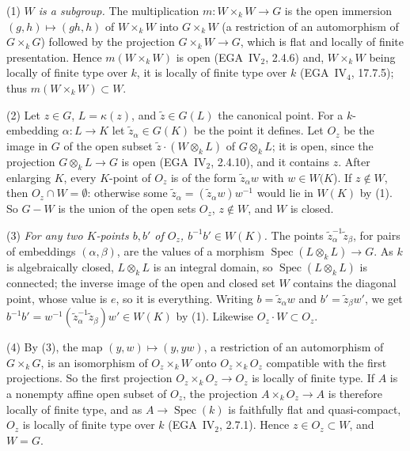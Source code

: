 (1) \emph{\(W\) is a subgroup.} The multiplication \(m\colon W\times_kW\to G\) is the open immersion
\((g,h)\mapsto(gh,h)\) of \(W\times_kW\) into \(G\times_kW\) (a restriction of an automorphism of
\(G\times_kG\)) followed by the projection \(G\times_kW\to G\), which is flat and locally of finite
presentation. Hence \(m(W\times_kW)\) is open (EGA~IV\(_2\), 2.4.6) and, \(W\times_kW\) being locally
of finite type over \(k\), it is locally of finite type over \(k\) (EGA~IV\(_4\), 17.7.5); thus
\(m(W\times_kW)\subset W\).

(2) Let \(z\in G\), \(L=\kappa(z)\), and \(\tilde z\in G(L)\) the canonical point. For a
\(k\)-embedding \(\alpha\colon L\to K\) let \(\tilde z_\alpha\in G(K)\) be the point it defines. Let
\(O_z\) be the image in \(G\) of the open subset \(\tilde z\cdot(W\otimes_kL)\) of \(G\otimes_kL\);
it is open, since the projection \(G\otimes_kL\to G\) is open (EGA~IV\(_2\), 2.4.10), and it contains
\(z\). After enlarging \(K\), every \(K\)-point of \(O_z\) is of the form \(\tilde z_\alpha w\) with
\(w\in W(K\)). If \(z\notin W\), then \(O_z\cap W=\emptyset\): otherwise some
\(\tilde z_\alpha=(\tilde z_\alpha w)w^{-1}\) would lie in \(W(K)\) by (1). So \(G-W\) is the union of
the open sets \(O_z\), \(z\notin W\), and \(W\) is closed.

(3) \emph{For any two \(K\)-points \(b,b'\) of \(O_z\), \(b^{-1}b'\in W(K)\).} The points
\(\tilde z_\alpha^{-1}\tilde z_\beta\), for pairs of embeddings \((\alpha,\beta)\), are the values of a
morphism \(\operatorname{Spec}(L\otimes_kL)\to G\). As \(k\) is algebraically closed, \(L\otimes_kL\)
is an integral domain, so \(\operatorname{Spec}(L\otimes_kL)\) is connected; the inverse image of the
open and closed set \(W\) contains the diagonal point, whose value is \(e\), so it is everything.
Writing \(b=\tilde z_\alpha w\) and \(b'=\tilde z_\beta w'\), we get
\(b^{-1}b'=w^{-1}(\tilde z_\alpha^{-1}\tilde z_\beta)w'\in W(K)\) by (1). Likewise
\(O_z\cdot W\subset O_z\).

(4) By (3), the map \((y,w)\mapsto(y,yw)\), a restriction of an automorphism of \(G\times_kG\), is an
isomorphism of \(O_z\times_kW\) onto \(O_z\times_kO_z\) compatible with the first projections. So the
first projection \(O_z\times_kO_z\to O_z\) is locally of finite type. If \(A\) is a nonempty affine
open subset of \(O_z\), the projection \(A\times_kO_z\to A\) is therefore locally of finite type, and
as \(A\to\operatorname{Spec}(k)\) is faithfully flat and quasi-compact, \(O_z\) is locally of finite
type over \(k\) (EGA~IV\(_2\), 2.7.1). Hence \(z\in O_z\subset W\), and \(W=G\).

